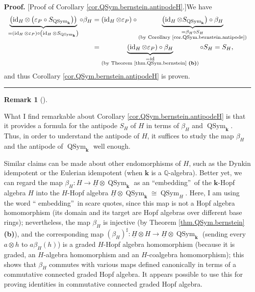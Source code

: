 \documentclass[numbers=enddot,12pt,final,onecolumn,notitlepage,abstracton]{scrartcl}%
\theoremstyle{definition}
\newtheorem{remk}[theo]{Remark}
\newenvironment{remark}[1][]
{\begin{remk}[#1]\begin{leftbar}}
{\end{leftbar}\end{remk}}
\newenvironment{proof}[1][Proof]{\noindent\textbf{#1.} }{\ \rule{0.5em}{0.5em}}
\begin{document}
\begin{proof}
[Proof of Corollary \ref{cor.QSym.bernstein.antipodeH}.]We have%
\begin{align*}
\underbrace{\left(  \operatorname*{id}\nolimits_{H}\otimes\left(
\varepsilon_{P}\circ S_{\operatorname*{QSym}\nolimits_{\mathbf{k}}}\right)
\right)  }_{=\left(  \operatorname*{id}\nolimits_{H}\otimes\varepsilon
_{P}\right)  \circ\left(  \operatorname*{id}\nolimits_{H}\otimes
S_{\operatorname*{QSym}\nolimits_{\mathbf{k}}}\right)  }\circ\beta_{H}  &
=\left(  \operatorname*{id}\nolimits_{H}\otimes\varepsilon_{P}\right)
\circ\underbrace{\left(  \operatorname*{id}\nolimits_{H}\otimes
S_{\operatorname*{QSym}\nolimits_{\mathbf{k}}}\right)  \circ\beta_{H}%
}_{\substack{=\beta_{H}\circ S_{H}\\\text{(by Corollary
\ref{cor.QSym.bernstein.antipode})}}}\\
&  =\underbrace{\left(  \operatorname*{id}\nolimits_{H}\otimes\varepsilon
_{P}\right)  \circ\beta_{H}}_{\substack{=\operatorname*{id}\\\text{(by Theorem
\ref{thm.QSym.bernstein} \textbf{(b)})}}}\circ S_{H}=S_{H},
\end{align*}
and thus Corollary \ref{cor.QSym.bernstein.antipodeH} is proven.
\end{proof}

\begin{remark}
\label{rmk.embed}What I find remarkable about Corollary
\ref{cor.QSym.bernstein.antipodeH} is that it provides a formula for the
antipode $S_{H}$ of $H$ in terms of $\beta_{H}$ and $\operatorname*{QSym}%
\nolimits_{\mathbf{k}}$. Thus, in order to understand the antipode of $H$, it
suffices to study the map $\beta_{H}$ and the antipode of
$\operatorname*{QSym}\nolimits_{\mathbf{k}}$ well enough.

Similar claims can be made about other endomorphisms of $H$, such as the
Dynkin idempotent or the Eulerian idempotent (when $\mathbf{k}$ is a
$\mathbb{Q}$-algebra). Better yet, we can regard the map $\beta_{H}%
:H\rightarrow\underline{H}\otimes\operatorname*{QSym}\nolimits_{\mathbf{k}}$
as an \textquotedblleft embedding\textquotedblright\ of the $\mathbf{k}$-Hopf
algebra $H$ into the $H$-Hopf algebra $\underline{H}\otimes
\operatorname*{QSym}\nolimits_{\mathbf{k}}\cong\operatorname*{QSym}%
\nolimits_{H}$. Here, I am using the word \textquotedblleft
embedding\textquotedblright\ in scare quotes, since this map is not a Hopf
algebra homomorphism (its domain and its target are Hopf algebras over
different base rings); nevertheless, the map $\beta_{H}$ is injective (by
Theorem \ref{thm.QSym.bernstein} \textbf{(b)}), and the corresponding map
$\left(  \beta_{H}\right)  ^{\sharp}:\underline{H}\otimes H\rightarrow
\underline{H}\otimes\operatorname*{QSym}\nolimits_{\mathbf{k}}$ (sending every
$a\otimes h$ to $a\beta_{H}\left(  h\right)  $) is a graded $H$-Hopf algebra
homomorphism (because it is graded, an $H$-algebra homomorphism and an
$H$-coalgebra homomorphism); this shows that $\beta_{H}$ commutes with various
maps defined canonically in terms of a commutative connected graded Hopf
algebra. It appears possible to use this for proving identities in commutative
connected graded Hopf algebra.
\end{remark}
\end{document}
